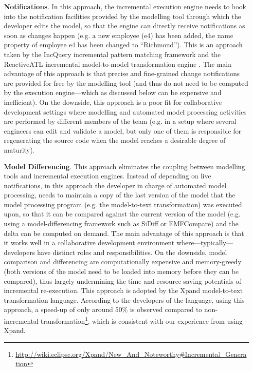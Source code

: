 \documentclass{llncs}
\begin{document}
\textbf{Notifications}. In this approach, the incremental execution engine needs to hook into the notification facilities provided by the modelling tool through which the developer edits the model, so that the engine can directly receive notifications as soon as changes happen (e.g. a new employee (e4) has been added, the name property of employee e4 has been changed to “Richmond”). This is an approach taken by the IncQuery incremental pattern matching framework \cite{rath2012derived} and the ReactiveATL incremental model-to-model transformation engine \cite{ogunyomi2015property}. The main advantage of this approach is that precise and fine-grained change notifications are provided for free by the modelling tool (and thus do not need to be computed by the execution engine---which as discussed below can be expensive and inefficient). On the downside, this approach is a poor fit for collaborative development settings
where modelling and automated model processing activities are performed by different members of the team (e.g. in a setup where several engineers can edit and validate a model, but only one of them is responsible for regenerating the source code when the model reaches a desirable degree of maturity).

\textbf{Model Differencing}. This approach eliminates the coupling between modelling tools and incremental execution engines. Instead of depending on live notifications, in this approach the developer in charge of automated model processing, needs to maintain a copy of the last version of the model that the model processing program (e.g. the model-to-text transformation) was executed upon, so that it can be compared against the current version of the model (e.g. using a model-differencing framework such as SiDiff or EMFCompare) and the delta can be computed on demand. The main advantage of this approach is that it works well in a collaborative development environment where---typically---developers have distinct roles and responsibilities. On the downside, model comparison and differencing are computationally expensive and memory-greedy (both versions of the model need to be loaded into memory before they can be compared), thus largely undermining the time and resource saving potentials of incremental re-execution. This approach is adopted by the Xpand model-to-text transformation language. According to the developers of the language, using this approach, a speed-up of only around 50\% is observed compared to non-incremental transformation\footnote{\url{http://wiki.eclipse.org/Xpand/New_And_Noteworthy\#Incremental_Generation}}, which is consistent with our experience from using Xpand.
\end{document}
